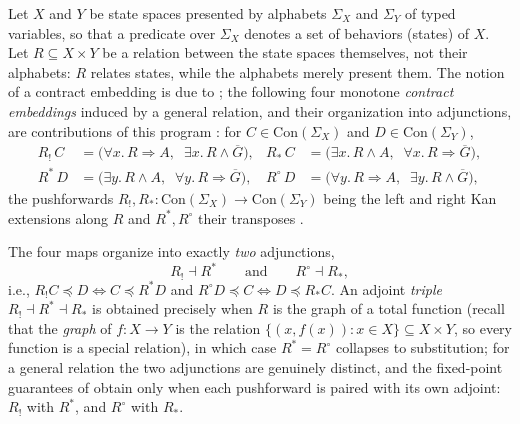 \documentclass[10pt]{article}
\newif\ifshowcomments
\renewcommand{\preceq}{\preccurlyeq}
\newcommand{\Con}[1]{\text{Con}(#1)}
\newcommand{\sat}[1]{\overline{#1}}
\theoremstyle{definition}
\theoremstyle{remark}
\newcommand{\hans}[1]{%
    \ifshowcomments
        \noindent\textcolor{buzzgold}{[Hans]: #1}%
    \fi
}
\newcommand{\ai}[1]{%
    \ifshowcomments
        \noindent\textcolor{techred}{[AI Agent]: #1}%
    \fi
}
\begin{document}
Let $X$ and $Y$ be state spaces presented by alphabets $\Sigma_X$ and $\Sigma_Y$ of typed variables, so that a predicate over $\Sigma_X$ denotes a set of behaviors (states) of $X$. Let $R \subseteq X \times Y$ be a relation between the state spaces themselves, not their alphabets: $R$ relates states, while the alphabets merely present them.
The notion of a contract embedding is due to \citet{naikContractEmbeddingsLayered2025}; the following four monotone \emph{contract embeddings} induced by a general relation, and their organization into adjunctions, are contributions of this program \citep{riessSEAMANMS2}: for $C \in \Con{\Sigma_X}$ and $D \in \Con{\Sigma_Y}$,
\begin{equation}
\label{eq:embeddings}
\begin{aligned}
R_{!}\,C &= \bigl(\forall x.\, R \Rightarrow A,\;\; \exists x.\, R \wedge \sat{G}\bigr), &
R_{\ast}\,C &= \bigl(\exists x.\, R \wedge A,\;\; \forall x.\, R \Rightarrow \sat{G}\bigr),\\
R^{\ast}\,D &= \bigl(\exists y.\, R \wedge A,\;\; \forall y.\, R \Rightarrow \sat{G}\bigr), &
R^{\circ}\,D &= \bigl(\forall y.\, R \Rightarrow A,\;\; \exists y.\, R \wedge \sat{G}\bigr),
\end{aligned}
\end{equation}
the pushforwards $R_{!}, R_{\ast} \colon \Con{\Sigma_X} \to \Con{\Sigma_Y}$ being the left and right Kan extensions along $R$ and $R^{\ast}, R^{\circ}$ their transposes \citep{riehl_category_2017}. \hans{flagging for final report: say what is the ``transpose.''} \ai{Flag preserved: the final report will define the transpose (the corresponding operations along the opposite relation $R^{\top} \subseteq Y \times X$) rather than leaning on the word.}
The four maps organize into exactly \emph{two} adjunctions,
\begin{equation}
\label{eq:adjunctions}
R_{!} \dashv R^{\ast}
\qquad\text{and}\qquad
R^{\circ} \dashv R_{\ast},
\end{equation}
i.e., $R_{!}C \preceq D \iff C \preceq R^{\ast}D$ and $R^{\circ}D \preceq C \iff D \preceq R_{\ast}C$. An adjoint \emph{triple} $R_{!} \dashv R^{\ast} \dashv R_{\ast}$ is obtained precisely when $R$ is the graph of a total function (recall that the \emph{graph} of $f \colon X \to Y$ is the relation $\{(x, f(x)) : x \in X\} \subseteq X \times Y$, so every function is a special relation), in which case $R^{\ast} = R^{\circ}$ collapses to substitution;
for a general relation the two adjunctions are genuinely distinct, and the fixed-point guarantees of  obtain only when each pushforward is paired with its own adjoint: $R_{!}$ with $R^{\ast}$, and $R^{\circ}$ with $R_{\ast}$.
\end{document}
